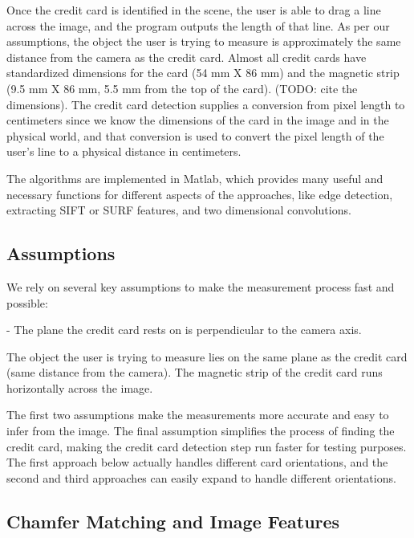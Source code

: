\documentclass[10pt,twocolumn,letterpaper]{article}
\begin{document}
Once the credit card is identified in the scene, the user is able to drag a line across the image, and the program outputs the length of that line. As per our assumptions, the object the user is trying to measure is approximately the same distance from the camera as the credit card. Almost all credit cards have standardized dimensions for the card (54 mm X 86 mm) and the magnetic strip (9.5 mm X 86 mm, 5.5 mm from the top of the card). (TODO: cite the dimensions). The credit card detection supplies a conversion from pixel length to centimeters since we know the dimensions of the card in the image and in the physical world, and that conversion is used to convert the pixel length of the user’s line to a physical distance in centimeters. 

	The algorithms are implemented in Matlab, which provides many useful and necessary functions for different aspects of the approaches, like edge detection, extracting SIFT or SURF features, and two dimensional convolutions.  

\subsection{Assumptions}

	We rely on several key assumptions to make the measurement process fast and possible:


- The plane the credit card rests on is perpendicular to the camera axis.

The object the user is trying to measure lies on the same plane as the credit card (same distance from the camera). 
The magnetic strip of the credit card runs horizontally across the image.


The first two assumptions make the measurements more accurate and easy to infer from the image. The final assumption simplifies the process of finding the credit card, making the credit card detection step run faster for testing purposes. The first approach below actually handles different card orientations, and the second and third approaches can easily expand to handle different orientations. 

\subsection{Chamfer Matching and Image Features}
\end{document}
